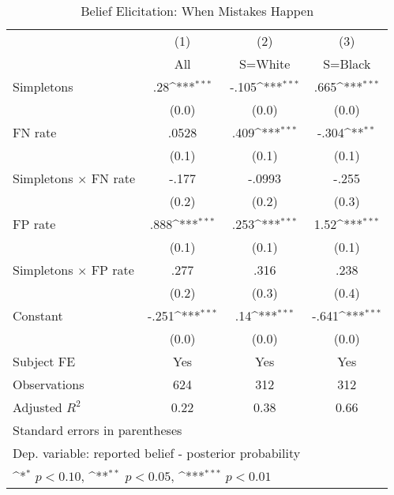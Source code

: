 \begin{table}[htbp]\centering
\def\sym#1{\ifmmode^{#1}\else\(^{#1}\)\fi}
\caption{Belief Elicitation: When Mistakes Happen}
\begin{tabular}{l*{3}{c}}
\hline\hline
                &\multicolumn{1}{c}{(1)}&\multicolumn{1}{c}{(2)}&\multicolumn{1}{c}{(3)}\\
                &\multicolumn{1}{c}{All}&\multicolumn{1}{c}{S=White}&\multicolumn{1}{c}{S=Black}\\
\hline
Simpletons      &      .28\sym{***}&    -.105\sym{***}&     .665\sym{***}\\
                &    (0.0)         &    (0.0)         &    (0.0)         \\
FN rate         &    .0528         &     .409\sym{***}&    -.304\sym{**} \\
                &    (0.1)         &    (0.1)         &    (0.1)         \\
Simpletons $\times$ FN rate&    -.177         &   -.0993         &    -.255         \\
                &    (0.2)         &    (0.2)         &    (0.3)         \\
FP rate         &     .888\sym{***}&     .253\sym{***}&     1.52\sym{***}\\
                &    (0.1)         &    (0.1)         &    (0.1)         \\
Simpletons $\times$ FP rate&     .277         &     .316         &     .238         \\
                &    (0.2)         &    (0.3)         &    (0.4)         \\
Constant        &    -.251\sym{***}&      .14\sym{***}&    -.641\sym{***}\\
                &    (0.0)         &    (0.0)         &    (0.0)         \\
Subject FE      &      Yes         &      Yes         &      Yes         \\
\hline
Observations    &      624         &      312         &      312         \\
Adjusted \(R^{2}\)&     0.22         &     0.38         &     0.66         \\
\hline\hline
\multicolumn{4}{l}{\footnotesize Standard errors in parentheses}\\
\multicolumn{4}{l}{\footnotesize Dep. variable: reported belief - posterior probability}\\
\multicolumn{4}{l}{\footnotesize \sym{*} \(p<0.10\), \sym{**} \(p<0.05\), \sym{***} \(p<0.01\)}\\
\end{tabular}
\end{table}
